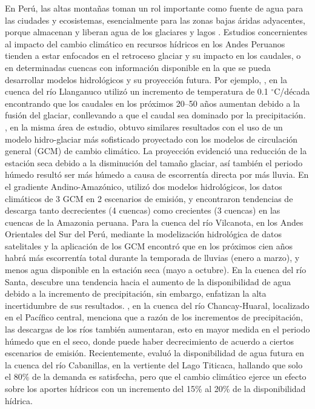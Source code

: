 \documentclass[12pt]{article}
\begin{document}
En Perú, las altas montañas toman un rol importante como fuente de agua para las ciudades y ecosistemas, esencialmente para las zonas bajas áridas adyacentes, porque almacenan y liberan agua de los glaciares y lagos \citep{Coudrain2005,Barnett2005,Viviroli2011}. Estudios concernientes al impacto del cambio climático en recursos hídricos en los Andes Peruanos tienden a estar enfocados en el retroceso glaciar \citep{VUILLE2018195,drenkhan2018current} y su impacto en los caudales, o en determinadas cuencas con información disponible en la que se pueda desarrollar modelos hidrológicos y su proyección futura. Por ejemplo, \citet{Pouyaud2005}, en la cuenca del río Llanganuco utilizó un incremento de temperatura de 0.1 $^{\circ}$C/década encontrando que los caudales en los próximos 20–50 años aumentan debido a la fusión del glaciar, conllevando a que el caudal sea dominado por la precipitación. \citet{Juen2007}, en la misma área de estudio, obtuvo similares resultados con el uso de un modelo hidro-glaciar más sofisticado proyectado con los modelos de circulación general (GCM) de cambio climático. La proyección evidenció una reducción de la estación seca debido a la disminución del tamaño glaciar, así también el periodo húmedo resultó ser más húmedo a causa de escorrentía directa por más lluvia. En el gradiente Andino-Amazónico, \citet{LavadoCasimiro2011} utilizó dos modelos hidrológicos, los datos climáticos de 3 GCM en 2 escenarios de emisión, y encontraron tendencias de descarga tanto decrecientes (4 cuencas) como crecientes (3 cuencas) en las cuencas de la Amazonia peruana. Para la cuenca del río Vilcanota, en los Andes Orientales del Sur del Perú, \citet{Andres2014} mediante la modelización hidrológica de datos satelitales y la aplicación de los GCM encontró que en los próximos cien años habrá más escorrentía total durante la temporada de lluvias (enero a marzo), y menos agua disponible en la estación seca (mayo a octubre). En la cuenca del río Santa, \citet{VanSoesbergen2016} descubre una tendencia hacia el aumento de la disponibilidad de agua debido a la incremento de precipitación, sin embargo, enfatizan la alta incertidumbre de sus resultados. \citet{Olsson2017}, en la cuenca del río Chancay-Huaral, localizado en el Pacífico central, menciona que a razón de los incrementos de precipitación, las descargas de los ríos también aumentaran, esto en mayor medida en el periodo húmedo que en el seco, donde puede haber decrecimiento de acuerdo a ciertos escenarios de emisión. Recientemente, \citet{Pilares2018} evaluó la disponibilidad de agua futura en la cuenca del río Cabanillas, en la vertiente del Lago Titicaca, hallando que solo el 80\% de la demanda es satisfecha, pero que el cambio climático ejerce un efecto sobre los aportes hídricos con un incremento del 15\% al 20\% de la disponibilidad hídrica. 
\end{document}
